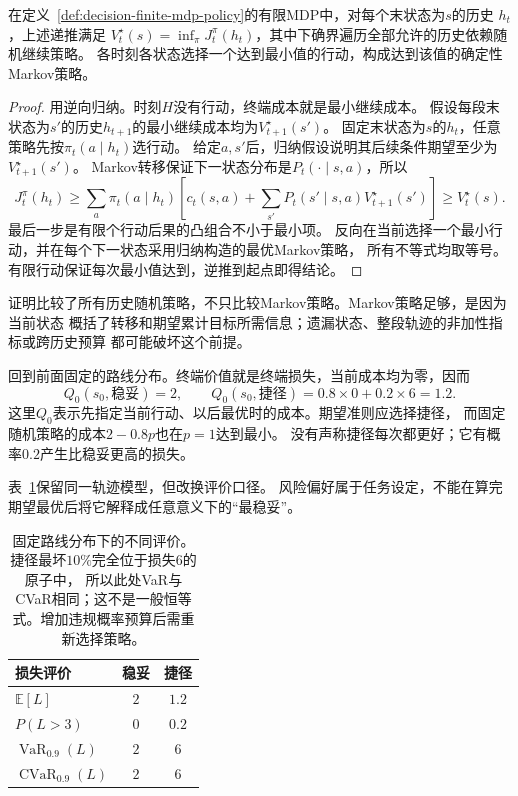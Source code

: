 \begin{theorem}[有限时域最优性原理]
\label{thm:decision-finite-horizon-optimality}
在定义~\ref{def:decision-finite-mdp-policy}的有限MDP中，对每个末状态为$s$的历史
$h_t$，上述递推满足
$V_t^\star(s)=\inf_\pi J_t^\pi(h_t)$，其中下确界遍历全部允许的历史依赖随机继续策略。
各时刻各状态选择一个达到最小值的行动，构成达到该值的确定性Markov策略。
\end{theorem}
\begin{proof}
用逆向归纳。时刻$H$没有行动，终端成本就是最小继续成本。
假设每段末状态为$s'$的历史$h_{t+1}$的最小继续成本均为$V_{t+1}^\star(s')$。
固定末状态为$s$的$h_t$，任意策略先按$\pi_t(a\mid h_t)$选行动。
给定$a,s'$后，归纳假设说明其后续条件期望至少为$V_{t+1}^\star(s')$。
Markov转移保证下一状态分布是$P_t(\cdot\mid s,a)$，所以
\[
  J_t^\pi(h_t)\geq
  \sum_a\pi_t(a\mid h_t)
    \left[c_t(s,a)+\sum_{s'}P_t(s'\mid s,a)V_{t+1}^\star(s')\right]
  \geq V_t^\star(s).
\]
最后一步是有限个行动后果的凸组合不小于最小项。
反向在当前选择一个最小行动，并在每个下一状态采用归纳构造的最优Markov策略，
所有不等式均取等号。有限行动保证每次最小值达到，逆推到起点即得结论。
\end{proof}
证明比较了所有历史随机策略，不只比较Markov策略。Markov策略足够，是因为当前状态
概括了转移和期望累计目标所需信息；遗漏状态、整段轨迹的非加性指标或跨历史预算
都可能破坏这个前提。

\begin{example}[两阶段路线选择]
\label{ex:decision-two-stage-route}
回到前面固定的路线分布。终端价值就是终端损失，当前成本均为零，因而
\[
  Q_0(s_0,\text{稳妥})=2,\qquad
  Q_0(s_0,\text{捷径})=0.8\times0+0.2\times6=1.2.
\]
这里$Q_0$表示先指定当前行动、以后最优时的成本。期望准则应选择捷径，
而固定随机策略的成本$2-0.8p$也在$p=1$达到最小。
没有声称捷径每次都更好；它有概率$0.2$产生比稳妥更高的损失。
\end{example}

表~\ref{tab:decision-route-risk-criteria}保留同一轨迹模型，但改换评价口径。
风险偏好属于任务设定，不能在算完期望最优后将它解释成任意意义下的“最稳妥”。
\begin{table}[htbp]
  \centering
  \begin{tabular}{lcc}
    \toprule
    损失评价 & 稳妥 & 捷径\\
    \midrule
    $\mathbb E[L]$ & $2$ & $1.2$\\
    $P(L>3)$ & $0$ & $0.2$\\
    $\operatorname{VaR}_{0.9}(L)$ & $2$ & $6$\\
    $\operatorname{CVaR}_{0.9}(L)$ & $2$ & $6$\\
    \bottomrule
  \end{tabular}
  \caption{固定路线分布下的不同评价。捷径最坏$10\%$完全位于损失$6$的原子中，
  所以此处VaR与CVaR相同；这不是一般恒等式。增加违规概率预算后需重新选择策略。}
  \label{tab:decision-route-risk-criteria}
\end{table}

